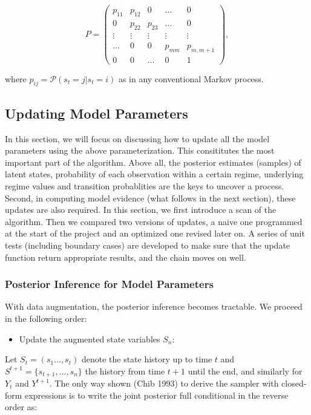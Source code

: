 \documentclass{article}
\begin{document}
\[P=\left(\begin{array}{cccccc}
p_{11} & p_{12} & 0 & \ldots & 0 \\
0 & p_{22} & p_{23} & \ldots & 0 \\
\vdots & \vdots & \vdots & \vdots & \vdots \\
\ldots & 0 & 0 & p_{mm} & p_{m,m+1} \\
0 & 0 & \ldots & 0 & 1 \end{array} \right),\]

where $p_{ij}=\mathcal{P}(s_t=j|s_t=i)$ as in any conventional Markov
process.

    \subsection{Updating Model Parameters}\label{updating-model-parameters}

In this section, we will focus on discussing how to update all the model
parameters using the above parameterization. This consititutes the most
important part of the algorithm. Above all, the posterior estimates
(samples) of latent states, probability of each observation within a
certain regime, underlying regime values and transition probablities are
the keys to uncover a process. Second, in computing model evidence (what
follows in the next section), these updates are also required. In this
section, we first introduce a scan of the algorithm. Then we compared
two versions of updates, a naive one programmed at the start of the
project and an optimized one revised later on. A series of unit tests
(including boundary cases) are developed to make sure that the update
function return appropriate results, and the chain moves on well.

\subsubsection{Posterior Inference for Model
Parameters}\label{posterior-inference-for-model-parameters}

With data augmentation, the posterior inference becomes tractable. We
proceed in the following order:

\begin{itemize}
\itemsep1pt\parskip0pt
\item
  Update the augmented state variables $S_n$:
\end{itemize}

Let $S_t=(s_1\ldots,s_t)$ denote the state history up to time $t$ and
$S^{t+1}=\{s_{t+1},\ldots,s_{n}\}$ the history from time $t+1$ until the
end, and similarly for $Y_t$ and $Y^{t+1}$. The only way shown (Chib
1993) to derive the sampler with closed-form expressions is to write the
joint posterior full conditional in the reverse order as:
\end{document}
